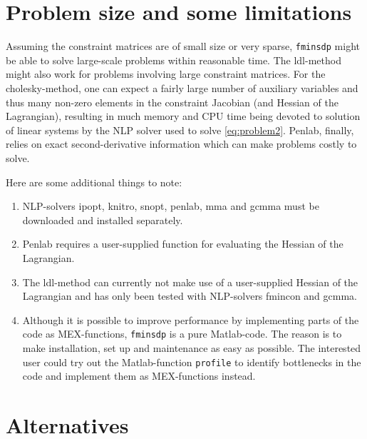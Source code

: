 \documentclass{article}
\begin{document}
 

\section{Problem size and some limitations}

Assuming the constraint matrices are of small size or very sparse, \texttt{fminsdp} might be able to solve large-scale problems within reasonable time. The ldl-method might also work for problems involving large constraint matrices. For the cholesky-method, one can expect a fairly large number of auxiliary variables and thus many non-zero elements in the constraint Jacobian (and Hessian of the Lagrangian), resulting in much memory and CPU time being devoted to solution of linear systems by the NLP solver used to solve \eqref{eq:problem2}. Penlab, finally, relies on exact second-derivative information which can make problems costly to solve.

Here are some additional things to note:
\begin{enumerate}
\item NLP-solvers ipopt, knitro, snopt, penlab, mma and gcmma must be downloaded and installed separately. 
\item Penlab requires a user-supplied function for evaluating the Hessian of the Lagrangian.
\item The ldl-method can currently not make use of a user-supplied Hessian of the Lagrangian and has
      only been tested with NLP-solvers fmincon and gcmma.     
\item Although it is possible to improve performance by implementing parts of the code as MEX-functions, \texttt{fminsdp} is a pure Matlab-code. The reason is to make installation, set up and maintenance as easy as possible.
The interested user could try out the Matlab-function \texttt{profile} to identify bottlenecks in the code and
implement them as MEX-functions instead. 
\end{enumerate}




\section{Alternatives}
\end{document}
